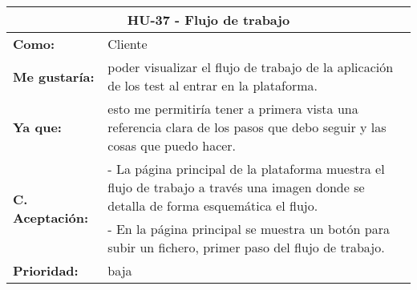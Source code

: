 
\begin{table}[H]
	\begin{tabular}{| p{3cm}| p{11cm} |}
		\hline
		\multicolumn{2}{|c|}{\textbf{HU-37} - Flujo de trabajo} \\ \hline
		\textbf{Como:} & Cliente \\ \hline
		\textbf{Me gustaría:} & poder visualizar el flujo de trabajo de la aplicación de los test al entrar en la plataforma. \\ \hline
		\textbf{Ya que:} & esto me permitiría tener a primera vista una referencia clara de los pasos que debo seguir y las cosas que puedo hacer. \\ \hline
		\multirow{2}{11cm}{\textbf{C. Aceptación:}} & - La página principal de la plataforma muestra el flujo de trabajo a través una imagen donde se detalla de forma esquemática el flujo. \\
		& - En la página principal se muestra un botón para subir un fichero, primer paso del flujo de trabajo. \\ \hline
		\textbf{\textbf{Prioridad:}} & baja \\ \hline
	\end{tabular}
\end{table}


